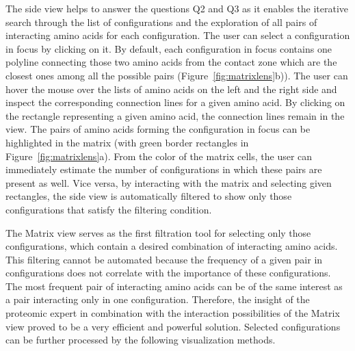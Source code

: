 \documentclass{bmcart}
\def\MatView {Matrix view\xspace}
\begin{document}
The side view helps to answer the questions Q2 and Q3 as it enables the iterative search through the list of configurations and the exploration of all pairs of interacting amino acids for each configuration.
The user can select a configuration in focus by clicking on it. 
By default, each configuration in focus contains one polyline connecting those two amino acids from the contact zone which are the closest ones among all the possible pairs (Figure~\ref{fig:matrixlens}b)).
The user can hover the mouse over the lists of amino acids on the left and the right side and inspect the corresponding connection lines for a given amino acid.
By clicking on the rectangle representing a given amino acid, the connection lines remain in the view. 
The pairs of amino acids forming the configuration in focus can be highlighted in the matrix (with green border rectangles in Figure~\ref{fig:matrixlens}a).
From the color of the matrix cells, the user can immediately estimate the number of configurations in which these pairs are present as well.
Vice versa, by interacting with the matrix and selecting given rectangles, the side view is automatically filtered to show only those configurations that satisfy the filtering condition.

The \MatView serves as the first filtration tool for selecting only those configurations, which contain a desired combination of interacting amino acids.
This filtering cannot be automated because the frequency of a given pair in configurations does not correlate with the importance of these configurations.
The most frequent pair of interacting amino acids can be of the same interest as a pair interacting only in one configuration.
Therefore, the insight of the proteomic expert in combination with the interaction possibilities of the \MatView proved to be a very efficient and powerful solution.
Selected configurations can be further processed by the following visualization methods.


\end{document}
